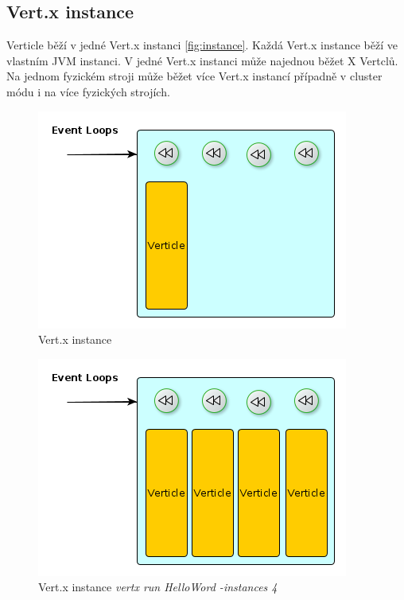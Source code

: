 \subsection{Vert.x instance}

Verticle běží v jedné Vert.x instanci \vref{fig:instance}. Každá Vert.x instance běží ve vlastním JVM instanci. V jedné Vert.x instanci může najednou běžet X Vertclů. Na jednom fyzickém stroji může běžet více Vert.x instancí případně v cluster módu i na více fyzických strojích.

\begin{figure}
\begin{centering}
\includegraphics[scale=0.5]{obrazky/instance}
\par\end{centering}
\caption{Vert.x instance \label{fig:instance}}
\end{figure}

\begin{figure}
\begin{centering}
\includegraphics[scale=0.5]{obrazky/instance4}
\par\end{centering}
\caption{Vert.x instance \emph{vertx run HelloWord -instances 4} \label{fig:instance4}}
\end{figure}

